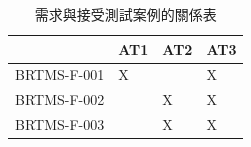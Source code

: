 				\begin{table}[htbp]
				\centering
				\caption{需求與接受測試案例的關係表}
				\label{table12}
				\begin{tabular}{@{}llll@{}}
				\toprule
				           & AT1 & AT2 & AT3 \\ \midrule
				BRTMS-F-001 & X   &     & X   \\
				BRTMS-F-002 &     & X   & X   \\
				BRTMS-F-003 &     & X   & X   \\ \bottomrule
				\end{tabular}
				\end{table}


	